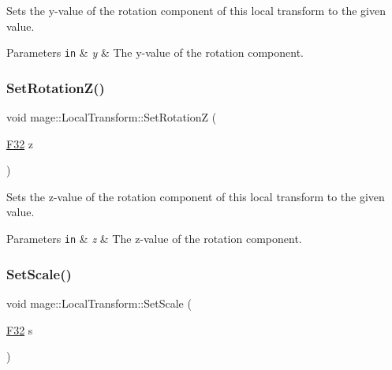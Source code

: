 Sets the y-\/value of the rotation component of this local transform to the given value.


\begin{DoxyParams}[1]{Parameters}
\mbox{\tt in}  & {\em y} & The y-\/value of the rotation component. \\
\hline
\end{DoxyParams}
\hypertarget{classmage_1_1_local_transform_a1dcec183b2f7ebf3fc7eb4ab574ca045}{}\label{classmage_1_1_local_transform_a1dcec183b2f7ebf3fc7eb4ab574ca045} 
\subsubsection{\texorpdfstring{Set\+Rotation\+Z()}{SetRotationZ()}}
{\footnotesize\ttfamily void mage\+::\+Local\+Transform\+::\+Set\+RotationZ (\begin{DoxyParamCaption}\item[{\hyperlink{namespacemage_aa97e833b45f06d60a0a9c4fc22ae02c0}{F32}}]{z }\end{DoxyParamCaption})\hspace{0.3cm}{\ttfamily [noexcept]}}

Sets the z-\/value of the rotation component of this local transform to the given value.


\begin{DoxyParams}[1]{Parameters}
\mbox{\tt in}  & {\em z} & The z-\/value of the rotation component. \\
\hline
\end{DoxyParams}
\hypertarget{classmage_1_1_local_transform_ae5940b8381188b25b164322d0c848fb3}{}\label{classmage_1_1_local_transform_ae5940b8381188b25b164322d0c848fb3} 
\subsubsection{\texorpdfstring{Set\+Scale()}{SetScale()}\hspace{0.1cm}{\footnotesize\ttfamily [1/4]}}
{\footnotesize\ttfamily void mage\+::\+Local\+Transform\+::\+Set\+Scale (\begin{DoxyParamCaption}\item[{\hyperlink{namespacemage_aa97e833b45f06d60a0a9c4fc22ae02c0}{F32}}]{s }\end{DoxyParamCaption})\hspace{0.3cm}{\ttfamily [noexcept]}}

